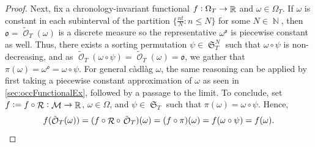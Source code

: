 \documentclass[11pt]{article}
\def\mo{\mathfrak{o}}
\theoremstyle{plain}
\theoremstyle{definition}
\DeclareMathOperator{\N}{\mathbb{N}}
\DeclareMathOperator{\R}{\mathbb{R}}
\DeclareMathOperator{\calB}{\mathcal{B}}
\DeclareMathOperator{\calM}{\mathcal{M}}
\DeclareMathOperator{\calO}{\mathcal{O}}
\DeclareMathOperator{\calR}{\mathcal{R}}
\DeclareMathOperator{\frakS}{\mathfrak{S}}
\begin{document}
\begin{proof}
Next,  fix a chronology-invariant functional $\textnormal{f}:\Omega_T \to \R$ and $\omega\in \Omega_T$. 
If $\omega$ is constant in each subinterval of the partition $\{\frac{nt}{N} : n\le N\}$ for some $N\in \N$, then $\mo = \tilde{\calO}_T(\omega)$ is a discrete measure so the representative $\omega^{\mo}$ is piecewise constant as well. Thus, there exists a sorting permutation $\psi \in \frakS_T^N$  such that  $\omega \circ \psi$ is non-decreasing, and as $\tilde{\calO}_T(\omega\circ \psi) = \tilde{\calO}_T(\omega) = \mo$, we gather that $\pi(\omega) = \omega^{\mo} = \omega \circ \psi$. 
For general càdlàg $\omega$, the same reasoning can be applied by first taking a piecewise constant approximation of $\omega$ as seen in \cref{sec:occFunctionalEx}, followed by a passage to the limit. 
To conclude, set $f:= \textnormal{f}\circ \calR:\calM \to \R$, $\omega\in \Omega$, and $\psi\in \frakS_T$ such that $\pi(\omega) =  \omega \circ \psi$. Hence,   
$$f(\tilde{\calO}_T(\omega))  = (\textnormal{f}\circ \calR \circ \  \tilde{\calO}_T)(\omega) = (\textnormal{f} \circ\pi)(\omega) =  \textnormal{f}(\omega \circ \psi) = \textnormal{f}(\omega). $$
\end{proof}

\end{document}
